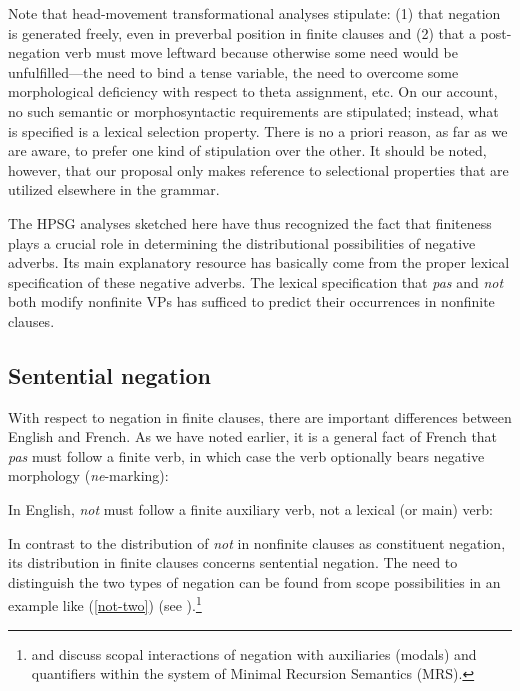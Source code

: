 \documentclass[output=paper
                ,modfonts
                		,nonflat
	        ,collection
	        ,collectionchapter
	        ,collectiontoclongg
 	        ,biblatex
                ,babelshorthands
                ,newtxmath
                ,draftmode
                ,colorlinks, citecolor=brown
]{./langsci/langscibook}
\begin{document}
{\begin{exe}
\begin{xlist}
\begin{exe}
\begin{xlist}
Note that head-movement transformational analyses stipulate: (1) that negation
is generated freely, even in preverbal position in finite clauses and (2) that
a post-negation verb must move leftward because otherwise some need would be
unfulfilled---the need to bind a tense variable, the need to overcome some
morphological deficiency with respect to theta assignment, etc. On our
account, no such semantic or morphosyntactic requirements are stipulated;
instead, what is specified is a lexical selection property. There is no a
priori reason, as far as we are aware, to prefer one kind of stipulation over
the other. It should be noted, however, that our proposal only makes reference
to selectional properties that are utilized elsewhere in the grammar.
\fi


The HPSG analyses sketched here have thus recognized
the fact that finiteness plays a crucial role in
determining the distributional possibilities of negative
adverbs. Its main explanatory resource
has basically come from the proper lexical specification of these negative
adverbs. The lexical specification that \textit{pas} and
\textit{not} both modify nonfinite VPs has sufficed to predict their
occurrences in nonfinite clauses.



\subsection{Sentential negation}

With respect to negation in finite clauses, there are important differences between English and French.
As we have noted earlier, it is a general fact of French that \textit{pas} must follow a finite verb, in which case the verb optionally bears negative morphology (\textit{ne}-marking):

\eal
{}
\zl
\noindent
In English, \textit{not} must follow a finite
auxiliary verb, not a lexical (or main) verb:

\eal
{}
\zl

In contrast to the distribution of \textit{not}
 in nonfinite clauses as constituent negation, its distribution
 in finite clauses concerns sentential
 negation.
  The need to distinguish the two types of negation can be found from scope
possibilities in an example like (\ref{not-two}) (see \citealt{Klima:64, Baker:89, Warner2000a-u}).\footnote{\citet{Warner2000a-u} and \citet{BL:13}
discuss scopal interactions of negation with auxiliaries (modals) and quantifiers
within the system of Minimal Recursion Semantics (MRS).}


\end{xlist}
\end{exe}
\end{xlist}
\end{exe}}
\end{document}
